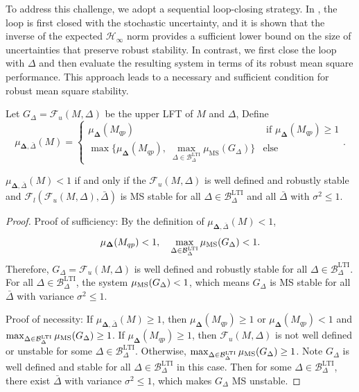 To address this challenge, we adopt a sequential loop-closing strategy. In \cite{Seiler2003BRLjs}, the loop is first closed with the stochastic uncertainty, and it is shown that the inverse of the expected $\mathcal{H}_\infty$ norm provides a sufficient lower bound on the size of uncertainties that preserve robust stability. In contrast, we first close the loop with $\Delta$ and then evaluate the resulting system in terms of its robust mean square performance. This approach leads to a necessary and sufficient condition for robust mean square stability.

\begin{defn}
Let $G_\Delta=\mathcal{F}_u(M,\Delta)$ be the upper LFT of $M$ and $\Delta$, Define 
$$
\mu_{\bm{\Delta},\bar{\Delta}} (M)= 
\begin{cases}
    \mu_{\bm{\Delta}}(M_{qp})& \text{ if }\mu_{\bm{\Delta}}(M_{qp})\geq 1\\
    \max\{\mu_{\bm{\Delta}}(M_{qp}),\;\max_{\Delta\in\mathcal{B}_\Delta^{\mathrm{LTI}}}\mu_{\mathrm{MS}}(G_{\Delta})\}& \text{else}
\end{cases}.
$$

\end{defn}

\begin{thm}
$\mu_{\bm{\Delta},\bar{\Delta}} (M)<1$ if and only if the $\mathcal{F}_u(M,\Delta)$ is well defined and robustly stable and $\mathcal{F}_l(\mathcal{F}_u(M,\Delta),\bar{\Delta})$ is MS stable for all $\Delta\in\mathcal{B}_\Delta^{\mathrm{LTI}}$ and all $\bar{\Delta}$ with $\sigma^2\leq1$.
\end{thm}
\begin{proof}
Proof of sufficiency: 
By the definition of \(\mu_{\bm{\Delta},\bar{\Delta}}(M)<1\), 
\[
\mu_{\bm{\Delta}}(M_{qp})<1,\quad  \max_{\Delta\in\mathcal{B}_\Delta^{\mathrm{LTI}}}\mu_{\rm{MS}}(G_{\Delta})<1.
\] 
Therefore, $G_{\Delta} = \mathcal{F}_u(M, \Delta)$ is well defined and robustly stable for all $\Delta\in\mathcal{B}_\Delta^{\mathrm{LTI}}$. For all $\Delta\in\mathcal{B}_\Delta^{\mathrm{LTI}}$, the system $\mu_{\rm{MS}}(G_\Delta)<1$, which means $G_{\Delta}$ is MS stable for all $\bar{\Delta}$ with variance $\sigma^2\leq1$.

Proof of necessity: If $\mu_{\bm{\Delta},\bar{\Delta}} (M)\geq1$, then $\mu_{\bm{\Delta}}(M_{qp})\geq1$ or $\mu_{\bm{\Delta}}(M_{qp})<1$ and $\max_{\Delta\in\mathcal{B}_\Delta^{\mathrm{LTI}}}\mu_{\rm{MS}}(G_{\Delta})\ge 1$. If $\mu_{\bm{\Delta}}(M_{qp})\geq1$, then $\mathcal{F}_u(M, \Delta)$ is not well defined or unstable for some $\Delta\in\mathcal{B}_\Delta^{\mathrm{LTI}}$. Otherwise, $\max_{\Delta\in\mathcal{B}_\Delta^{\mathrm{LTI}}}\mu_{\rm{MS}}(G_{\Delta})\geq1$. Note $G_{\Delta}$ is well defined and stable for all $\Delta\in\mathcal{B}_\Delta^{\mathrm{LTI}}$ in this case. Then for some ${\Delta}\in\mathcal{B}_\Delta^{\mathrm{LTI}}$, there exist $\bar{\Delta}$ with variance $\sigma^2\leq1$, which makes $G_\Delta$ MS unstable.
\end{proof}

